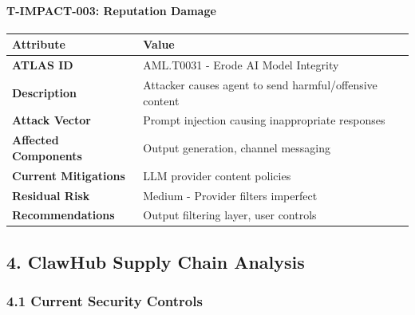 \paragraph{T-IMPACT-003: Reputation Damage}



\begin{table}[h]
\centering
\small
\begin{tabular}{|l|l|}
\hline
Attribute & Value \\
\hline
\textbf{ATLAS ID} & AML.T0031 - Erode AI Model Integrity \\
\hline
\textbf{Description} & Attacker causes agent to send harmful/offensive content \\
\hline
\textbf{Attack Vector} & Prompt injection causing inappropriate responses \\
\hline
\textbf{Affected Components} & Output generation, channel messaging \\
\hline
\textbf{Current Mitigations} & LLM provider content policies \\
\hline
\textbf{Residual Risk} & Medium - Provider filters imperfect \\
\hline
\textbf{Recommendations} & Output filtering layer, user controls \\
\hline
\end{tabular}
\end{table}



\hrulefill


\subsection{4. ClawHub Supply Chain Analysis}


\subsubsection{4.1 Current Security Controls}



